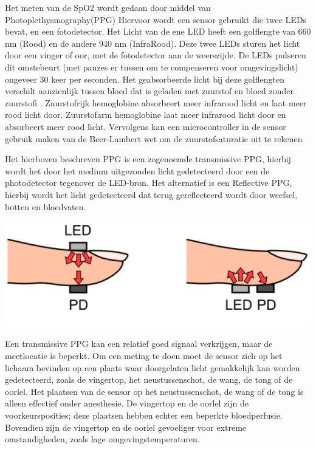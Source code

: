 \documentclass[11pt]{article}
\begin{document}
    Het meten van de SpO2 wordt gedaan door middel van Photoplethysmography(PPG) Hiervoor wordt een sensor gebruikt die twee LEDs bevat, en een fotodetector. 
    Het Licht van de ene LED heeft een golflengte van 660 nm (Rood) en de andere 940 nm (InfraRood). Deze twee LEDs sturen het licht door een vinger of oor, met de fotodetector aan de weerszijde. 
    De LEDs pulseren dit omstebeurt (met pauzes er tussen om te compenseren voor omgevingslicht) ongeveer 30 keer per seconden. 
    Het geabsorbeerde licht bij deze golflengten verschilt aanzienlijk tussen bloed dat is geladen met zuurstof en bloed zonder zuurstofi \citep{tamura2014wearable}. 
    Zuurstofrijk hemoglobine absorbeert meer infrarood licht en laat meer rood licht door. Zuurstofarm hemoglobine laat meer infrarood licht door en absorbeert meer rood licht. 
    Vervolgens kan een microcontroller in de sensor gebruik maken van de Beer-Lambert wet om de zuurstofsaturatie uit te rekenen\citep{principlespulsox}

    Het hierboven beschreven PPG is een zogenoemde transmissive PPG, hierbij wordt het door het medium uitgezonden licht gedetecteerd door een de photodetector tegenover de LED-bron. 
    Het alternatief is een Reflective PPG, hierbij wordt het licht gedetecteerd dat terug gereflecteerd wordt door weefsel, botten en bloedvaten.

    
    \includegraphics[height=0.2\textheight]{Images/Tamura1.png}

    \citep[Image from][]{tamura2014wearable}

    Een transmissive PPG kan een relatief goed signaal verkrijgen, maar de meetlocatie is beperkt. 
    Om een meting te doen moet de sensor zich op het lichaam bevinden op een plaats waar doorgelaten licht gemakkelijk kan worden gedetecteerd, zoals de vingertop, het neustussenschot, de wang, de tong of de oorlel. 
    Het plaatsen van de sensor op het neustussenschot, de wang of de tong is alleen effectief onder anesthesie. 
    De vingertop en de oorlel zijn de voorkeursposities; deze plaatsen hebben echter een beperkte bloedperfusie. 
    Bovendien zijn de vingertop en de oorlel gevoeliger voor extreme omstandigheden, zoals lage omgevingstemperaturen.
\end{document}
